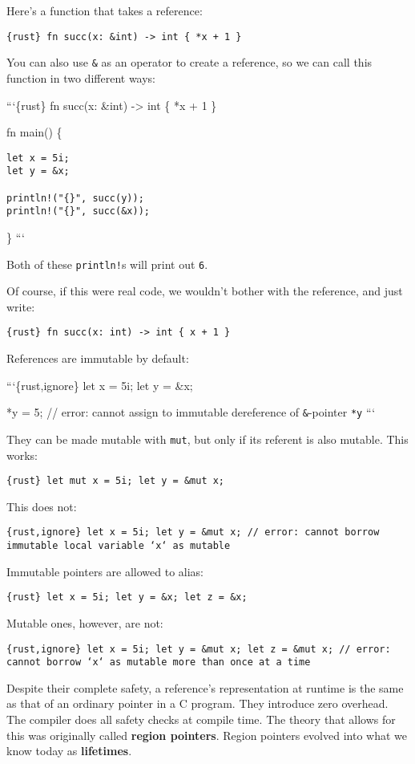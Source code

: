 \documentclass[]{article}
\begin{document}
Here's a function that takes a reference:

\texttt{\{rust\} fn succ(x: \&int) -\textgreater{} int \{ *x + 1 \}}

You can also use \texttt{\&} as an operator to create a reference, so we
can call this function in two different ways:

```\{rust\} fn succ(x: \&int) -\textgreater{} int \{ *x + 1 \}

fn main() \{

\begin{verbatim}
let x = 5i;
let y = &x;

println!("{}", succ(y));
println!("{}", succ(&x));
\end{verbatim}

\} ```

Both of these \texttt{println!}s will print out \texttt{6}.

Of course, if this were real code, we wouldn't bother with the
reference, and just write:

\texttt{\{rust\} fn succ(x: int) -\textgreater{} int \{ x + 1 \}}

References are immutable by default:

```\{rust,ignore\} let x = 5i; let y = \&x;

*y = 5; // error: cannot assign to immutable dereference of
\texttt{\&}-pointer \texttt{*y} ```

They can be made mutable with \texttt{mut}, but only if its referent is
also mutable. This works:

\texttt{\{rust\} let mut x = 5i; let y = \&mut x;}

This does not:

\texttt{\{rust,ignore\} let x = 5i; let y = \&mut x; // error: cannot borrow immutable local variable `x` as mutable}

Immutable pointers are allowed to alias:

\texttt{\{rust\} let x = 5i; let y = \&x; let z = \&x;}

Mutable ones, however, are not:

\texttt{\{rust,ignore\} let x = 5i; let y = \&mut x; let z = \&mut x; // error: cannot borrow `x` as mutable more than once at a time}

Despite their complete safety, a reference's representation at runtime
is the same as that of an ordinary pointer in a C program. They
introduce zero overhead. The compiler does all safety checks at compile
time. The theory that allows for this was originally called
\textbf{region pointers}. Region pointers evolved into what we know
today as \textbf{lifetimes}.
\end{document}
